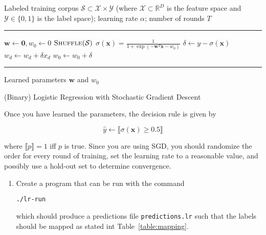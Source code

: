 \documentclass[12pt,letterpaper]{article}
\begin{document}
\begin{enumerate}
\begin{algorithm}
\begin{algorithmic}
    Labeled training corpus $\mathcal{S} \subset \mathcal{X} \times \mathcal{Y}$ (where $\mathcal{X} \subset \mathbb{R}^D$ is the feature space and  $\mathcal{Y} \in \{0,1\}$ is the label space); learning rate $\alpha$; number of rounds $T$
   \vspace{0.5em}
   \hrule
   \vspace{0.5em}
   \STATE $\mathbf{w} \leftarrow \mathbf{0}, w_0 \leftarrow 0$
   \STATE {}
      \STATE $\textsc{Shuffle}(\mathcal{S})$
         \STATE $\sigma(\mathbf{x}) = \frac{1}{1 + \exp(-\mathbf{w}^T\mathbf{x} - w_0)}$
         \STATE $\delta \leftarrow y - \sigma(\mathbf{x})$
         \STATE {}
            \STATE $w_d \leftarrow w_d + \delta x_d$
         \ENDFOR
         \STATE $w_0 \leftarrow w_0 + \delta$ 
      \ENDFOR
   \ENDFOR
   \vspace{0.5em}
   \hrule
   \vspace{0.5em}
    Learned parameters $\mathbf{w}$ and $w_0$ 
\caption{(Binary) Logistic Regression with Stochastic Gradient Descent}
\label{alg:lr}
\end{algorithmic}
\end{algorithm}

\clearpage
Once you have learned the parameters, the decision rule is given by

$$\hat{y} \leftarrow \llbracket  \sigma(\mathbf{x}) \geq 0.5 \rrbracket$$

where $\llbracket p \rrbracket = 1$ iff $p$ is true.  Since you are using SGD, you should randomize the order for every round of training, set the learning rate to a reasonable value, and possibly use a hold-out set to determine convergence.

\begin{enumerate}
\item
Create a program that can be run with the command

{\tt ./lr-run}

which should produce a predictions file {\tt predictions.lr} such that the labels should be mapped as stated int Table~\ref{table:mapping}.


\end{enumerate}
\end{enumerate}
\end{document}
